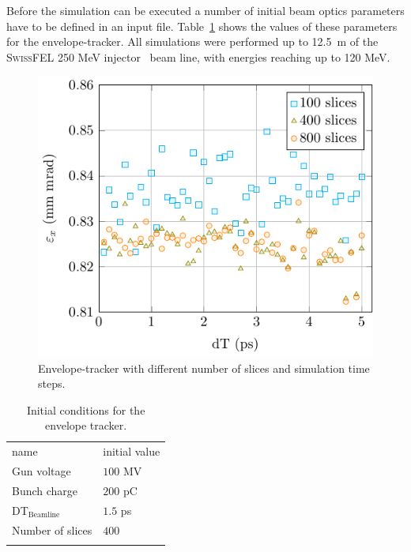 Before the simulation can be executed a number of initial beam optics
  parameters have to be defined in an input file.
Table~\ref{tbl:et_params} shows the values of these parameters for the
  envelope-tracker.
All simulations were performed up to 12.5~m of the
  \textsc{SwissFEL} 250 MeV injector~\cite{pedr:10} beam line, with
  energies reaching  up to 120 MeV.

\begin{figure}%
  \centering
  \includegraphics[width=0.8\linewidth]{Report/dt_scan}
  \caption{Envelope-tracker with different number of slices and simulation
    time steps.}
  \label{fig:et-dt}
\end{figure}

\begin{table}
  \begin{center}
    \caption{Initial conditions for the envelope tracker.}
    \label{tbl:et_params}
    \begin{tabular}{ll}
      \hline\noalign{\smallskip}
      name & initial value \\
      \noalign{\smallskip}\hline\noalign{\smallskip}
        Gun voltage       & $100$ MV\\
        Bunch charge      & $200$ pC\\
        DT$_{\text{Beamline}}$  & $1.5$ ps\\
        Number of slices  & $400$ \\
      \noalign{\smallskip}\hline
    \end{tabular}
  \end{center}
\end{table}

